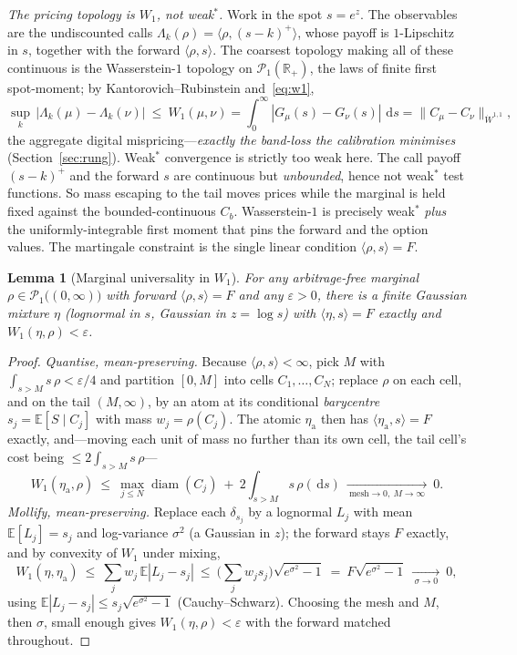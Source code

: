 \documentclass[11pt]{article}
\newtheorem{lemma}[theorem]{Lemma}
\newcommand{\E}{\mathbb{E}}
\newcommand{\R}{\mathbb{R}}
\newcommand{\dd}{\,\mathrm{d}}
\begin{document}
\emph{The pricing topology is $W_1$, not weak\(^*\).} Work in the spot $s=e^z$. The observables
are the undiscounted calls $\Lambda_k(\rho)=\langle\rho,(s-k)^+\rangle$, whose payoff is
$1$-Lipschitz in $s$, together with the forward $\langle\rho,s\rangle$. The coarsest topology
making all of these continuous is the Wasserstein-$1$ topology on $\mathcal P_1(\R_{+})$, the laws
of finite first spot-moment; by Kantorovich--Rubinstein and~\eqref{eq:w1},
\[
\sup_{k}\,\big|\Lambda_k(\mu)-\Lambda_k(\nu)\big|\ \le\ W_1(\mu,\nu)
=\int_0^\infty|G_\mu(s)-G_\nu(s)|\,\dd s
=\big\|C_\mu-C_\nu\big\|_{\dot W^{1,1}},
\]
the aggregate digital mispricing---\emph{exactly the band-loss the calibration minimises}
(Section~\ref{sec:rung}). Weak\(^*\) convergence is strictly too weak here. The call payoff $(s-k)^+$ and the forward
$s$ are continuous but \emph{unbounded}, hence not weak\(^*\) test functions. So mass escaping to
the tail moves prices while the marginal is held fixed against the bounded-continuous $C_b$. Wasserstein-$1$ is precisely weak\(^*\) \emph{plus} the
uniformly-integrable first moment that pins the forward and the option values. The martingale
constraint is the single linear condition $\langle\rho,s\rangle=F$.

\begin{lemma}[Marginal universality in $W_1$]\label{lem:marg-dense}
For any arbitrage-free marginal $\rho\in\mathcal P_1\big((0,\infty)\big)$ with forward
$\langle\rho,s\rangle=F$ and any $\varepsilon>0$, there is a finite Gaussian mixture $\eta$
(lognormal in $s$, Gaussian in $z=\log s$) with $\langle\eta,s\rangle=F$ \emph{exactly} and
$W_1(\eta,\rho)<\varepsilon$.
\end{lemma}

\begin{proof}
\emph{Quantise, mean-preserving.} Because $\langle\rho,s\rangle<\infty$, pick $M$ with
$\int_{s>M}s\,\rho<\varepsilon/4$ and partition $[0,M]$ into cells $C_1,\dots,C_N$; replace $\rho$
on each cell, and on the tail $(M,\infty)$, by an atom at its conditional \emph{barycentre}
$s_j=\E[S\mid C_j]$ with mass $w_j=\rho(C_j)$. The atomic $\eta_{\mathrm a}$ then has
$\langle\eta_{\mathrm a},s\rangle=F$ exactly, and---moving each unit of mass no further than its
own cell, the tail cell's cost being $\le2\int_{s>M}s\,\rho$---
\[
W_1(\eta_{\mathrm a},\rho)\ \le\ \max_{j\le N}\operatorname{diam}(C_j)\ +\ 2\!\int_{s>M}\!s\,\rho(\dd s)
\ \xrightarrow[\ \text{mesh}\to0,\ M\to\infty\ ]{}\ 0 .
\]
\emph{Mollify, mean-preserving.} Replace each $\delta_{s_j}$ by a lognormal $L_j$ with mean
$\E[L_j]=s_j$ and log-variance $\sigma^2$ (a Gaussian in $z$); the forward stays $F$ exactly, and
by convexity of $W_1$ under mixing,
\[
W_1(\eta,\eta_{\mathrm a})\ \le\ \sum_j w_j\,\E|L_j-s_j|
\ \le\ \Big(\textstyle\sum_j w_j s_j\Big)\sqrt{e^{\sigma^2}-1}
\ =\ F\sqrt{e^{\sigma^2}-1}\ \xrightarrow[\ \sigma\to0\ ]{}\ 0 ,
\]
using $\E|L_j-s_j|\le s_j\sqrt{e^{\sigma^2}-1}$ (Cauchy--Schwarz). Choosing the mesh and $M$, then
$\sigma$, small enough gives $W_1(\eta,\rho)<\varepsilon$ with the forward matched throughout.
\end{proof}
\end{document}
